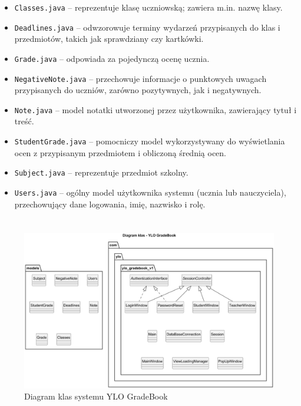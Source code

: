 \begin{itemize}
    \item \texttt{Classes.java} – reprezentuje klasę uczniowską; zawiera m.in. nazwę klasy.
    \item \texttt{Deadlines.java} – odwzorowuje terminy wydarzeń przypisanych do klas i przedmiotów, takich jak sprawdziany czy kartkówki.
    \item \texttt{Grade.java} – odpowiada za pojedynczą ocenę ucznia.
    \item \texttt{NegativeNote.java} – przechowuje informacje o punktowych uwagach przypisanych do uczniów, zarówno pozytywnych, jak i negatywnych.
    \item \texttt{Note.java} – model notatki utworzonej przez użytkownika, zawierający tytuł i treść.
    \item \texttt{StudentGrade.java} – pomocniczy model wykorzystywany do wyświetlania ocen z przypisanym przedmiotem i obliczoną średnią ocen.
    \item \texttt{Subject.java} – reprezentuje przedmiot szkolny.
    \item \texttt{Users.java} – ogólny model użytkownika systemu (ucznia lub nauczyciela), przechowujący dane logowania, imię, nazwisko i rolę.
\end{itemize}

\section*{}
\begin{figure}[H]
    \centering
    \includegraphics[width=1\textwidth]{figures/fig_0003.eps}
    \caption{Diagram klas systemu YLO GradeBook}
    \label{fig:diagramUML}
\end{figure}



